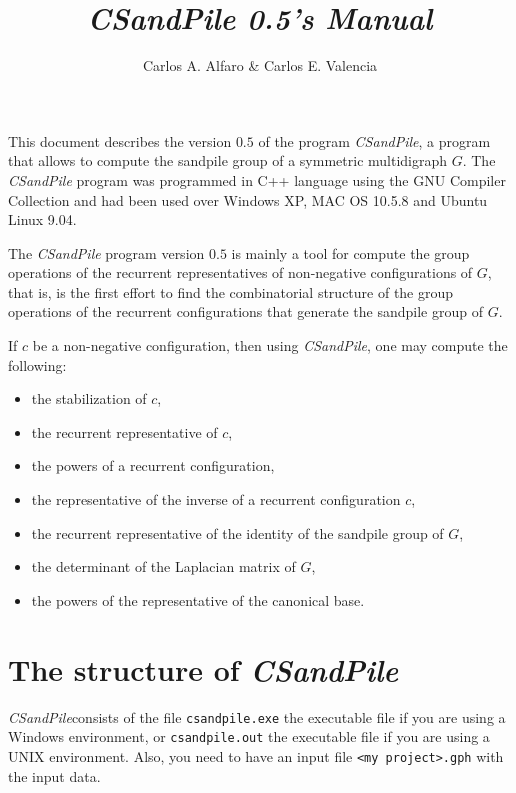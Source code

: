\documentclass{article}
\title{{\it CSandPile 0.5's Manual}}
\author{Carlos A. Alfaro \& Carlos E. Valencia}
\date{}
\begin{document}
\maketitle

This document describes the version $0.5$ of the program {\it CSandPile}, a program that allows to compute the sandpile group of a symmetric multidigraph $G$.
The {\it CSandPile} program was programmed in C++ language using the GNU Compiler Collection and had been used over Windows XP, MAC OS 10.5.8 and Ubuntu Linux 9.04.

The {\it CSandPile} program version $0.5$ is mainly a tool for compute the group operations of the recurrent representatives of non-negative configurations of $G$, 
that is, is the first effort to find the combinatorial structure of the group operations of the recurrent configurations that generate the sandpile group of $G$.

If $c$ be a non-negative configuration, then using {\it CSandPile}, one may compute the following:
\begin{itemize}
	\item the stabilization of $c$,
	\item the recurrent representative of $c$,
	\item the powers of  a recurrent configuration,
	\item the representative  of the inverse of a recurrent configuration $c$,
	\item the recurrent representative of the identity of the sandpile group of $G$, 
	\item the determinant of the Laplacian matrix of $G$,
	\item the powers of the representative of the canonical base.	
\end{itemize}

\section{The structure of {\it CSandPile}}

{\it CSandPile}consists of the file \texttt{csandpile.exe} the executable file if you are using a Windows environment, or \texttt{csandpile.out} the executable file if you are using a UNIX environment.
Also, you need to have an input file \texttt{<my project>.gph}  with the input data.
\end{document}
